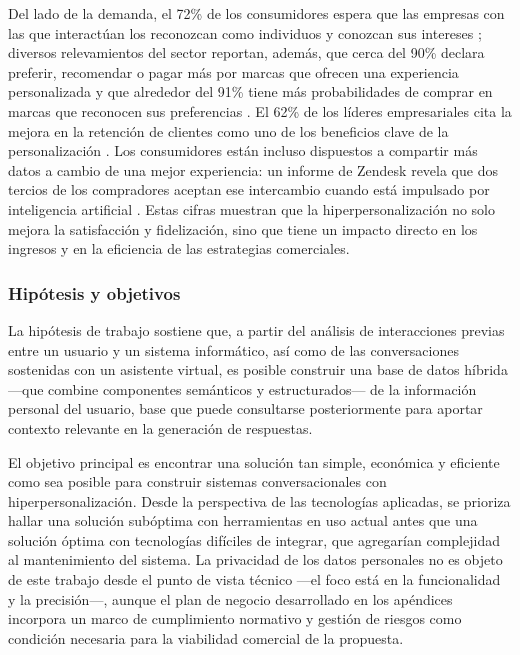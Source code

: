 Del lado de la demanda, el 72\% de los consumidores espera que las empresas con las que interactúan los reconozcan como individuos y conozcan sus intereses \parencite{McKinsey2021}; diversos relevamientos del sector reportan, además, que cerca del 90\% declara preferir, recomendar o pagar más por marcas que ofrecen una experiencia personalizada \parencite{Outgrow2023} y que alrededor del 91\% tiene más probabilidades de comprar en marcas que reconocen sus preferencias \parencite{Ninetailed2024}. El 62\% de los líderes empresariales cita la mejora en la retención de clientes como uno de los beneficios clave de la personalización \parencite{TwilioSegment2023}. Los consumidores están incluso dispuestos a compartir más datos a cambio de una mejor experiencia: un informe de Zendesk revela que dos tercios de los compradores aceptan ese intercambio cuando está impulsado por inteligencia artificial \parencite{Zendesk2024}. Estas cifras muestran que la hiperpersonalización no solo mejora la satisfacción y fidelización, sino que tiene un impacto directo en los ingresos y en la eficiencia de las estrategias comerciales.

\subsubsection{Hipótesis y objetivos}

La hipótesis de trabajo sostiene que, a partir del análisis de interacciones previas entre un usuario y un sistema informático, así como de las conversaciones sostenidas con un asistente virtual, es posible construir una base de datos híbrida —que combine componentes semánticos y estructurados— de la información personal del usuario, base que puede consultarse posteriormente para aportar contexto relevante en la generación de respuestas.

El objetivo principal es encontrar una solución tan simple, económica y eficiente como sea posible para construir sistemas conversacionales con hiperpersonalización. Desde la perspectiva de las tecnologías aplicadas, se prioriza hallar una solución subóptima con herramientas en uso actual antes que una solución óptima con tecnologías difíciles de integrar, que agregarían complejidad al mantenimiento del sistema. La privacidad de los datos personales no es objeto de este trabajo desde el punto de vista técnico —el foco está en la funcionalidad y la precisión—, aunque el plan de negocio desarrollado en los apéndices incorpora un marco de cumplimiento normativo y gestión de riesgos como condición necesaria para la viabilidad comercial de la propuesta.

